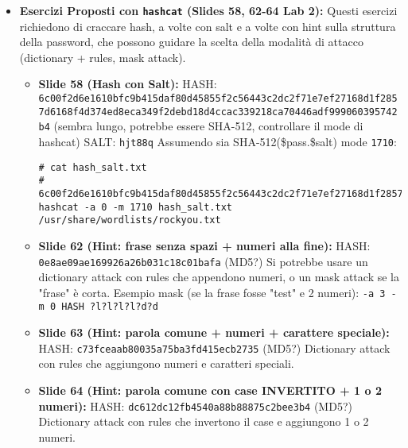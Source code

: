 \begin{itemize}
\begin{itemize}
\begin{verbatim}
hashcat -a 0 -m 10 "ccee5504c9d889922b101124e9e43b71:1234" /usr/share/wordlists/rockyou.txt
\end{verbatim}
        \item \textbf{MD5 semplice, dictionary attack con rules (Slide 61 Lab 2):}
        Hash: \texttt{401518eee35b49f00bc0a3ab74c4915e} (password: "Hola123!")
        (Supponendo che "hola" sia in \texttt{rockyou.txt}, una regola potrebbe trasformarla in "Hola123!")
\begin{verbatim}
hashcat -a 0 -m 0 -r /usr/share/hashcat/rules/best64.rule "401518eee35b49f00bc0a3ab74c4915e" /usr/share/wordlists/rockyou.txt
# O usando una ruleset più aggressiva come TOXICv2.rule se best64 non basta
# hashcat -a 0 -m 0 -r /usr/share/hashcat/rules/TOXICv2.rule "401518eee35b49f00bc0a3ab74c4915e" /usr/share/wordlists/rockyou.txt
\end{verbatim}
    \end{itemize}
    \item \textbf{Esercizi Proposti con \texttt{hashcat} (Slides 58, 62-64 Lab 2):}
    Questi esercizi richiedono di craccare hash, a volte con salt e a volte con hint sulla struttura della password, che possono guidare la scelta della modalità di attacco (dictionary + rules, mask attack).
    \begin{itemize}
        \item \textbf{Slide 58 (Hash con Salt):}
        HASH: \texttt{6c00f2d6e1610bfc9b415daf80d45855f2c56443c2dc2f71e7ef27168d1f2857d6168f4d374ed8eca349f2debd18d4ccac339218ca70446adf999060395742b4} (sembra lungo, potrebbe essere SHA-512, controllare il mode di hashcat)
        SALT: \texttt{hjt88q}
        Assumendo sia SHA-512(\$pass.\$salt) mode \texttt{1710}:
\begin{verbatim}
# cat hash_salt.txt
# 6c00f2d6e1610bfc9b415daf80d45855f2c56443c2dc2f71e7ef27168d1f2857d6168f4d374ed8eca349f2debd18d4ccac339218ca70446adf999060395742b4:hjt88q
hashcat -a 0 -m 1710 hash_salt.txt /usr/share/wordlists/rockyou.txt
\end{verbatim}
        \item \textbf{Slide 62 (Hint: frase senza spazi + numeri alla fine):}
        HASH: \texttt{0e8ae09ae169926a26b031c18c01bafa} (MD5?)
        Si potrebbe usare un dictionary attack con rules che appendono numeri, o un mask attack se la "frase" è corta.
        Esempio mask (se la frase fosse "test" e 2 numeri): \texttt{-a 3 -m 0 HASH ?l?l?l?l?d?d}
        \item \textbf{Slide 63 (Hint: parola comune + numeri + carattere speciale):}
        HASH: \texttt{c73fceaab80035a75ba3fd415ecb2735} (MD5?)
        Dictionary attack con rules che aggiungono numeri e caratteri speciali.
        \item \textbf{Slide 64 (Hint: parola comune con case INVERTITO + 1 o 2 numeri):}
        HASH: \texttt{dc612dc12fb4540a88b88875c2bee3b4} (MD5?)
        Dictionary attack con rules che invertono il case e aggiungono 1 o 2 numeri.
    \end{itemize}
\end{itemize}

